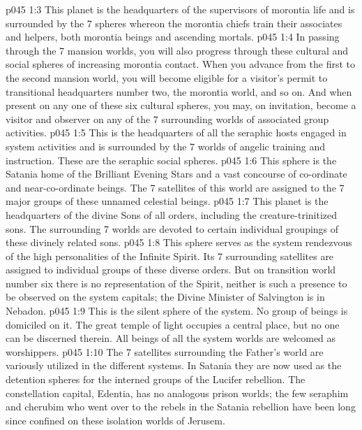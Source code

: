 \vs p045 1:3 \pc {} This planet is the headquarters of the supervisors of morontia life and is surrounded by the 7 spheres whereon the morontia chiefs train their associates and helpers, both morontia beings and ascending mortals.
\vs p045 1:4 In passing through the 7 mansion worlds, you will also progress through these cultural and social spheres of increasing morontia contact. When you advance from the first to the second mansion world, you will become eligible for a visitor’s permit to transitional headquarters number two, the morontia world, and so on. And when present on any one of these six cultural spheres, you may, on invitation, become a visitor and observer on any of the 7 surrounding worlds of associated group activities.
\vs p045 1:5 \pc {} This is the headquarters of all the seraphic hosts engaged in system activities and is surrounded by the 7 worlds of angelic training and instruction. These are the seraphic social spheres.
\vs p045 1:6 \pc {} This sphere is the Satania home of the Brilliant Evening Stars and a vast concourse of co\hyp{}ordinate and near\hyp{}co\hyp{}ordinate beings. The 7 satellites of this world are assigned to the 7 major groups of these unnamed celestial beings.
\vs p045 1:7 \pc {} This planet is the headquarters of the divine Sons of all orders, including the creature\hyp{}trinitized sons. The surrounding 7 worlds are devoted to certain individual groupings of these divinely related sons.
\vs p045 1:8 \pc {} This sphere serves as the system rendezvous of the high personalities of the Infinite Spirit. Its 7 surrounding satellites are assigned to individual groups of these diverse orders. But on transition world number six there is no representation of the Spirit, neither is such a presence to be observed on the system capitals; the Divine Minister of Salvington is  in Nebadon.
\vs p045 1:9 \pc {} This is the silent sphere of the system. No group of beings is domiciled on it. The great temple of light occupies a central place, but no one can be discerned therein. All beings of all the system worlds are welcomed as worshippers.
\vs p045 1:10 The 7 satellites surrounding the Father’s world are variously utilized in the different systems. In Satania they are now used as the detention spheres for the interned groups of the Lucifer rebellion. The constellation capital, Edentia, has no analogous prison worlds; the few seraphim and cherubim who went over to the rebels in the Satania rebellion have been long since confined on these isolation worlds of Jerusem.
